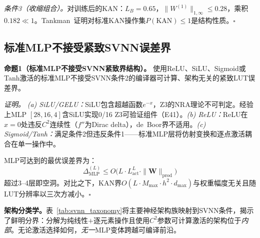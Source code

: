 \textit{条件3（收缩组合）。}对训练后的KAN：$L_B = 0.65$，$\|W^{(1)}\|_{1,\infty} \leq 0.28$，乘积$0.182 \ll 1$。Tankman~\cite{tankman2026lipschitz}证明对标准KAN操作集$P(\text{KAN}) \leq 1$是结构性质。$\square$

\subsection{标准MLP不接受紧致SVNN误差界}
\label{sec:svnn-mlp}

\vspace{4pt}
\noindent\textbf{命题1（标准MLP不接受SVNN紧致界结构）。}
使用ReLU、SiLU、Sigmoid或Tanh激活的标准MLP不接受SVNN条件2的编译器可计算、架构无关的紧致LUT误差界。

\vspace{4pt}
\noindent\textit{证明。}
\textit{(a) SiLU/GELU：}SiLU包含超越函数$e^{-x}$，Z3的NRA理论不可判定。经验上MLP $[28,16,4]$含SiLU实现0/16 Z3可验证组件（E41）。\textit{(b) ReLU：}ReLU在$x=0$处违反$C^2$连续性（$f''$为Dirac delta），de~Boor界不适用。\textit{(c) Sigmoid/Tanh：}满足条件2但违反条件1——标准MLP层将仿射变换和逐点激活耦合在单一操作中。

MLP可达到的最优误差界为：
\begin{equation}
\Delta_{\text{MLP}}^{(L)} \leq O\bigl(L \cdot L_{\text{act}}^L \cdot \|\mathbf{W}\|_{\text{prod}}\bigr)
\label{eq:mlp_bound}
\end{equation}
超过3--4层即空洞。对比之下，KAN界$O(L \cdot M_{\max} \cdot h^2 \cdot d_{\max})$与权重幅度无关且随LUT分辨率以三次方减小。$\square$

\vspace{4pt}
\noindent\textbf{架构分类学。}表~\ref{tab:svnn_taxonomy}将主要神经架构族映射到SVNN条件，揭示了鲜明分界：分解为纯线性$+$逐元素操作且使用$C^2$参数可计算激活的架构位于\textit{内部}。无论激活选择如何，\textit{无一}MLP变体跨越可编译前沿。

